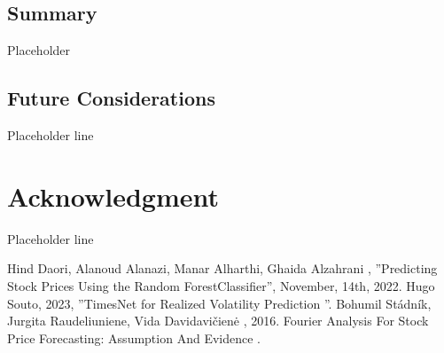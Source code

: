 \documentclass{ieeeojies}
\begin{document}
\subsection{Summary}
Placeholder
\subsection{Future Considerations}
Placeholder line
\section*{Acknowledgment}
Placeholder line

\begin{thebibliography}{00}
 Hind Daori, Alanoud Alanazi, Manar Alharthi, Ghaida Alzahrani
 ,  ''Predicting Stock Prices Using the Random ForestClassifier'', November, 14th, 2022.
 Hugo Souto, 2023, ''TimesNet for Realized Volatility Prediction
''.
 Bohumil Stádník, Jurgita Raudeliuniene, Vida Davidavičienė , 2016. Fourier Analysis For Stock Price Forecasting: Assumption And Evidence .

\end{thebibliography}


\EOD
\end{document}
